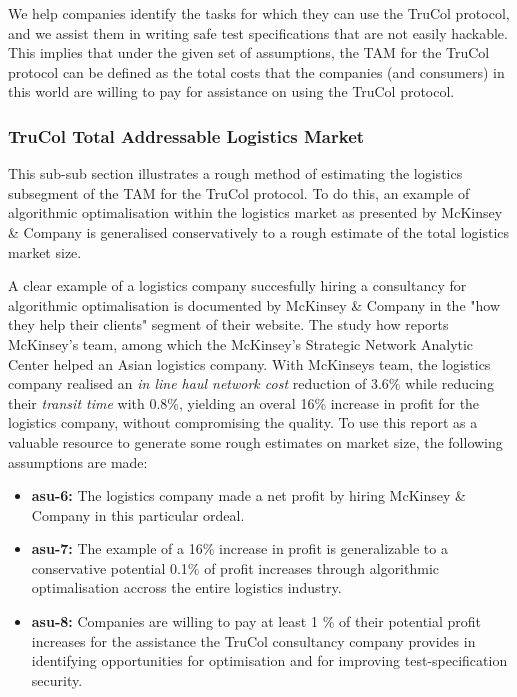 We help companies identify the tasks for which they can use the TruCol protocol, and we assist them in writing safe test specifications that are not easily hackable. This implies that under the given set of assumptions, the TAM for the TruCol protocol can be defined as the total costs that the companies (and consumers) in this world are willing to pay for assistance on using the TruCol protocol. 

\subsubsection{TruCol Total Addressable Logistics Market}\label{subsubsec:tam_logistics}

This sub-sub section illustrates a rough method of estimating the logistics subsegment of the TAM for the TruCol protocol. To do this, an example of algorithmic optimalisation within the logistics market as presented by McKinsey \& Company is generalised conservatively to a rough estimate of the total logistics market size.

A clear example of a logistics company succesfully hiring a consultancy for algorithmic optimalisation is documented by McKinsey \& Company in the "how they help their clients" segment of their website\cite{mckinsey_algo}. The study how reports McKinsey's team, among which the McKinsey's Strategic Network Analytic Center helped an Asian logistics company. With McKinseys team, the logistics company realised an \textit{in line haul network cost} reduction of 3.6\% while reducing their \textit{transit time} with 0.8\%, yielding an overal 16\% increase in profit for the logistics company, without compromising the quality. To use this report as a valuable resource to generate some rough estimates on market size, the following assumptions are made:

 \begin{itemize}
 	\item \textbf{asu-6:} The logistics company made a net profit by hiring McKinsey \& Company in this particular ordeal.
	\item \textbf{asu-7:} The example of a 16\% increase in profit is generalizable to a conservative potential 0.1\% of profit increases through algorithmic optimalisation accross the entire logistics industry.
	\item \textbf{asu-8:} Companies are willing to pay at least 1 \% of their potential profit increases for the assistance the TruCol consultancy company provides in identifying opportunities for optimisation and for improving test-specification security.
\end{itemize}

